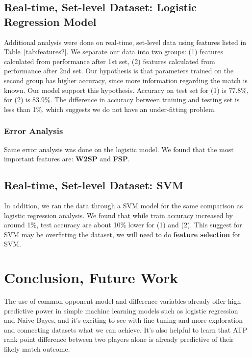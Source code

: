 \documentclass[paper=a4, fontsize=11pt]{scrartcl} %
\numberwithin{equation}{section} %
\numberwithin{figure}{section} %
\numberwithin{table}{section} %
\begin{document}
\subsection{Real-time, Set-level Dataset: Logistic Regression Model}
Additional analysis were done on real-time, set-level data using features listed in Table~\ref{tab:features2}. We separate our data into two groups: (1) features calculated from performance after 1st set, (2) features calculated from performance after 2nd set.  Our hypothesis is that parameters trained on the second group has higher accuracy, since more information regarding the match is known.  Our model support this hypothesis.  Accuracy on test set for (1) is 77.8\%, for (2) is 83.9\%.  The difference in accuracy between training and testing set is less than 1\%, which suggests we do not have an under-fitting problem.
\subsubsection{Error Analysis}
Same error analysis was done on the logistic model.  We found that the most important features are: \textbf{W2SP} and \textbf{FSP}.
\subsection{Real-time, Set-level Dataset:  SVM}
In addition, we ran the data through a SVM model for the same comparison as logistic regression analysis.  We found that while train accuracy increased by around 1\%, test accuracy are about 10\%  lower for (1) and (2).  This suggest for SVM may be overfitting the dataset, we will need to do \textbf{feature selection} for SVM.

\section{Conclusion, Future Work}
The use of common opponent model and difference variables already offer high predictive power in simple machine learning models such as logistic regression and Naive Bayes, and it's exciting to see with fine-tuning and more exploration and connecting datasets what we can achieve. It's also helpful to learn that ATP rank point difference between two players alone is already predictive of their likely match outcome. 
\end{document}
